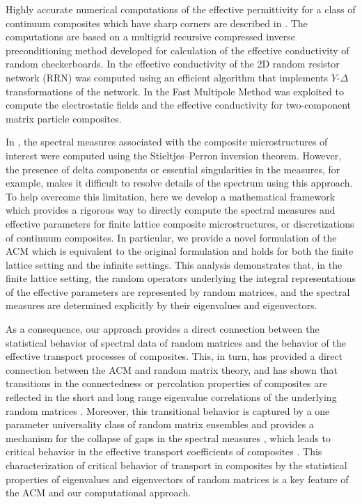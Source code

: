\documentclass{cmslatex}
\begin{document}
Highly accurate numerical computations of the effective permittivity
for a class of continuum composites which have sharp corners are
described in \cite{Helsing:NJP:115005}. The computations are based on
a multigrid recursive compressed inverse preconditioning method
\cite{Helsing:2008:8820,Helsing:JCP:1171,Helsing:JCP:7533} developed 
for calculation of the effective conductivity of random
checkerboards. In \cite{Day:JPCM-96} the effective 
conductivity of the 2D random resistor network (RRN) 
was computed using an efficient algorithm that implements $Y$-$\Delta$
transformations of the network. In
\cite{Greengard:1994:379,Cheng:1997:629,Greengard:2006:64} the Fast
Multipole Method was exploited to compute the electrostatic fields and
the effective conductivity for two-component matrix particle
composites.      


In \cite{Helsing:NJP:115005,Day:JPCM-96}, the spectral measures
associated with the composite microstructures of interest were
computed using the Stieltjes--Perron inversion theorem. However, the
presence of delta components or essential singularities in the
measures, for example, makes it difficult to resolve details of the
spectrum using this approach. To help overcome this limitation, here
we develop a mathematical framework which provides a rigorous way to
directly compute the spectral measures and effective parameters for
finite lattice composite microstructures, or discretizations of
continuum composites. In particular, we provide a novel
formulation of the ACM which is equivalent to
the original formulation \cite{Golden:CMP-473,Bruno:PRSLA-353} and
holds for both the finite lattice setting and the infinite
settings. This analysis demonstrates that, in the finite lattice
setting, the random operators underlying the integral representations
of the effective parameters are represented by random matrices, and
the spectral measures are determined explicitly by their eigenvalues
and eigenvectors.   



As a consequence,
our approach provides a direct connection between the statistical
behavior of spectral data of random matrices and the behavior of the
effective transport processes of composites. This, in turn, has
provided a direct connection between the ACM and random matrix theory,
and has shown that transitions in the connectedness or percolation
properties of composites are reflected in the short and long range
eigenvalue correlations of the underlying random matrices
\cite{Murphy_RMT_of_Composites}. Moreover, this transitional behavior
is captured by a one parameter universality class of random matrix
ensembles and provides a mechanism for the collapse of gaps in the
spectral measures \cite{Murphy_RMT_of_Composites}, which leads to
critical behavior in the effective transport coefficients of
composites \cite{Murphy:JMP:063506}. This characterization of critical
behavior of transport in composites by the statistical properties of
eigenvalues and eigenvectors of random matrices is a key feature of
the ACM and our computational approach. 
\end{document}

